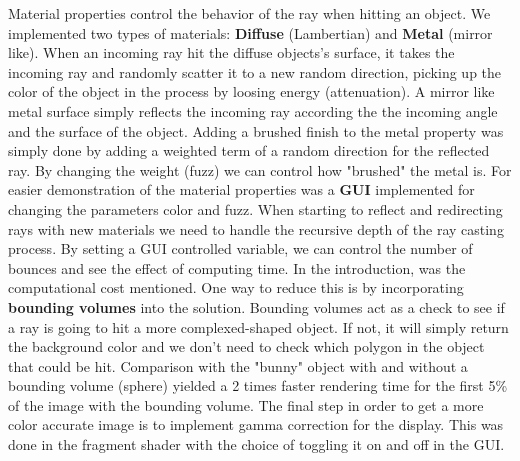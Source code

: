 \documentclass[a4paper]{article}
\begin{document}
\begin{multicols}{2}
Material properties control the behavior of the ray when hitting an object. We implemented two types of materials: \textbf{Diffuse} (Lambertian) and \textbf{Metal} (mirror like). When an incoming ray hit the diffuse objects's surface, it takes the incoming ray and randomly scatter it to a new random direction, picking up the color of the object in the process by loosing energy (attenuation). A mirror like metal surface simply reflects the incoming ray according the the incoming angle and the surface of the object. Adding a brushed finish to the metal property was simply done by adding a weighted term of a random direction for the reflected ray. By changing the weight (fuzz) we can control how "brushed" the metal is. For easier demonstration of the material properties was a \textbf{GUI} implemented for changing the parameters color and fuzz. When starting to reflect and redirecting rays with new materials we need to handle the recursive depth of the ray casting process. By setting a GUI controlled variable, we can control the number of bounces and see the effect of computing time. In the introduction, was the computational cost mentioned. One way to reduce this is by incorporating \textbf{bounding volumes} into the solution. Bounding volumes act as a check to see if a ray is going to hit a more complexed-shaped object. If not, it will simply return the background color and we don't need to check which polygon in the object that could be hit. Comparison with the "bunny" object with and without a bounding volume (sphere) yielded a 2 times faster rendering time for the first 5\% of the image with the bounding volume. The final step in order to get a more color accurate image is to implement gamma correction for the display. This was done in the fragment shader with the choice of toggling it on and off in the GUI.  

\vspace{-5mm}

\raggedright


\end{multicols}
\end{document}
